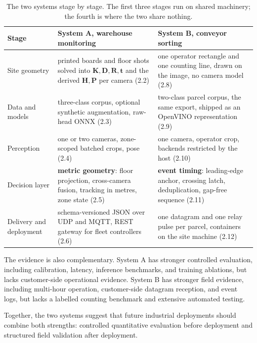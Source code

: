 \documentclass[9pt,a4paper,twocolumn]{rho-class/rho}
\begin{document}
\begin{table}[tbp]
    \caption{The two systems stage by stage. The first three stages run on shared machinery; the fourth is where the two share nothing.}
    \label{tab:stagemap}
    \centering
    \footnotesize
    \setlength{\tabcolsep}{3pt}
    \begin{tabular}{>{\raggedright\arraybackslash}p{}>{\raggedright\arraybackslash}p{}>{\raggedright\arraybackslash}p{}}
    \toprule
    \textbf{Stage} & \textbf{System A, warehouse monitoring} & \textbf{System B, conveyor sorting} \\
    \midrule
    1 Site geometry & printed boards and floor shots solved into $\mathbf{K}, \mathbf{D}, \mathbf{R}, \mathbf{t}$ and the derived $\mathbf{H}, \mathbf{P}$ per camera (2.2) & one operator rectangle and one counting line, drawn on the image, no camera model (2.8) \\
    2 Data and models & three-class corpus, optional synthetic augmentation, raw-head ONNX (2.3) & two-class parcel corpus, the same export, shipped as an OpenVINO representation (2.9) \\
    3 Perception & one or two cameras, zone-scoped batched crops, pose (2.4) & one camera, operator crop, backends restricted by the host (2.10) \\
    4 Decision layer & \textbf{metric geometry}: floor projection, cross-camera fusion, tracking in metres, zone state (2.5) & \textbf{event timing}: leading-edge anchor, crossing latch, deduplication, gap-free sequence (2.11) \\
    5 Delivery and deployment & schema-versioned JSON over UDP and MQTT, REST gateway for fleet controllers (2.6) & one datagram and one relay pulse per parcel, containers on the site machine (2.12) \\
    \bottomrule
    \end{tabular}
\end{table}

The evidence is also complementary. System A has stronger controlled evaluation, including calibration, latency, inference benchmarks, and training ablations, but lacks customer-side operational evidence. System B has stronger field evidence, including multi-hour operation, customer-side datagram reception, and event logs, but lacks a labelled counting benchmark and extensive automated testing.

Together, the two systems suggest that future industrial deployments should combine both strengths: controlled quantitative evaluation before deployment and structured field validation after deployment.
\end{document}
